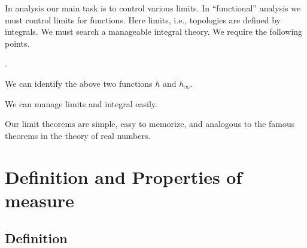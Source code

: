 \documentclass[openany, a4paper, oneside]{jsbook}
\newcounter{enum2}
\renewenvironment{enumerate}{%
\begin{list}%
{%
\arabic{enum2}.\ \,%
}%
{%
\usecounter{enum2}
\setlength{\itemindent}{0pt}%
\setlength{\leftmargin}{15pt}%
\setlength{\rightmargin}{0pt}%
\setlength{\labelsep}{0pt}%
\setlength{\labelwidth}{6pt}%
\setlength{\itemsep}{0pt}%
\setlength{\parsep}{0pt}%
\setlength{\listparindent}{0pt}%
}
}{%
\end{list}%
}
\theoremstyle{break}
\theoremstyle{breakdefn}
\begin{document}
In analysis our main task is to control various limits.
In ``functional'' analysis we must control limits for functions.
Here limits, i.e., topologies are defined by integrals.
We must search a manageable integral theory.
We require the following points.
\begin{enumerate}
\item We can identify the above two functions $h$ and $h_{\infty}$.
\item We can manage limits and integral easily.
\item Our limit theorems are simple, easy to memorize, and analogous to the famous theorems in the theory of real numbers.
\end{enumerate}
\section{Definition and Properties of measure}

\subsection{Definition}
\end{document}
